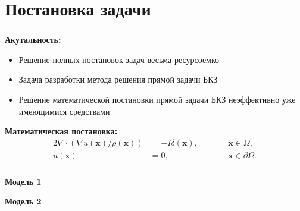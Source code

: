 

\frame[plain]{\titlepage} %


\section{Постановка задачи}

\begin{frame}
\frametitle{\insertsection}


\textbf{Акутальность:}
\begin{itemize}
\item Решение полных постановок задач весьма ресурсоемко
\item Задача разработки метода решения прямой задачи БКЗ
\item Решение математической постановки прямой задачи БКЗ неэффективно уже имеющимися средствами
\end{itemize}
\bigskip

\textbf{Математическая постановка:}
\begin{alignat}{2}
\nabla \cdot (\nabla u(\bm x) / \rho(\bm x)) &= -I \delta(\bm x),\qquad && \bm x \in \Omega, \label{eq:poisson}\\
u(\bm x) &= 0, && \bm x \in \partial \Omega. \label{eq:dirichet}
\end{alignat}
\end{frame}

\begin{frame}
\frametitle{\insertsection}

\begin{minipage}[t]{0.47\linewidth}
    \textbf{Модель 1}
\end{minipage}
\hfill
\begin{minipage}[t]{0.47\linewidth}
    \textbf{Модель 2}
\end{minipage}
\end{frame}


